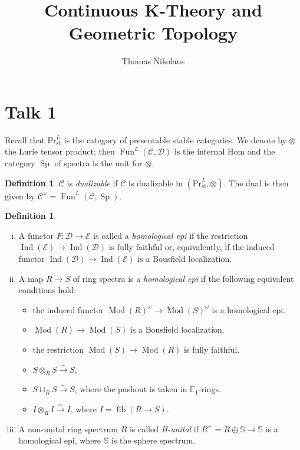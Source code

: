 \documentclass[draft]{amsart}
\newcommand{\EE}{\mathbb{E}}
\renewcommand{\SS}{\mathbb{S}}
\newcommand{\cat}[1]{\mathcal{#1}}
\newcommand{\isoto}{\mathbin{\xrightarrow{\sim}}}
\renewcommand{\Pr}{\mathrm{Pr}}
\DeclareMathOperator{\fib}{fib}
\DeclareMathOperator{\Ind}{Ind}
\DeclareMathOperator{\Sp}{Sp}
\DeclareMathOperator{\Fun}{Fun}
\DeclareMathOperator{\Mod}{Mod}
\theoremstyle{definition}
\newtheorem{defn}[thm]{Definition}
\begin{document}
\title{Continuous K-Theory and Geometric Topology}
\author{Thomas Nikolaus}
\maketitle
\tableofcontents

\section{Talk 1}
Recall that $\Pr^L_{\mathrm{st}}$ is the category of presentable stable categories. We denote by $\otimes$ the Lurie tensor product; then $\Fun^L(\cat C, \cat D)$ is the internal Hom and the category $\Sp$ of spectra is the unit for $\otimes$.

\begin{defn}
$\cat C$ is \emph{dualizable} if $\cat C$ is dualizable in $(\Pr^L_{\mathrm{st}}, \otimes)$. The dual is then given by $\cat C^\vee = \Fun^L(\cat C, \Sp)$.
\end{defn}

\begin{defn}
\begin{enumerate}[(i)]
\item A functor $F\colon \cat D\to \cat E$ is called a \emph{homological epi} if the restriction $\Ind(\cat E)\to \Ind(\cat D)$ is fully faithful or, equivalently, if the induced functor $\Ind(\cat D)\to \Ind(\cat E)$ is a Bousfield localization.

\item A map $R\to S$ of ring spectra is a \emph{homological epi} if the following equivalent conditions hold:
\begin{itemize}
\item the induced functor $\Mod(R)^{\omega} \to \Mod(S)^\omega$ is a homological epi.
\item $\Mod(R) \to \Mod(S)$ is a Bousfield localization.
\item the restriction $\Mod(S) \to \Mod(R)$ is fully faithful.
\item $S\otimes_RS \isoto S$.
\item $S\sqcup_RS \isoto S$, where the pushout is taken in $\EE_1$-rings.
\item $I\otimes_RI \isoto I$, where $I = \fib(R\to S)$.
\end{itemize}

\item A non-unital ring spectrum $R$ is called \emph{H-unital} if $R^+ = R\oplus \SS \to \SS$ is a homological epi, where $\SS$ is the sphere spectrum.
\end{enumerate}
\end{defn}
\end{document}
